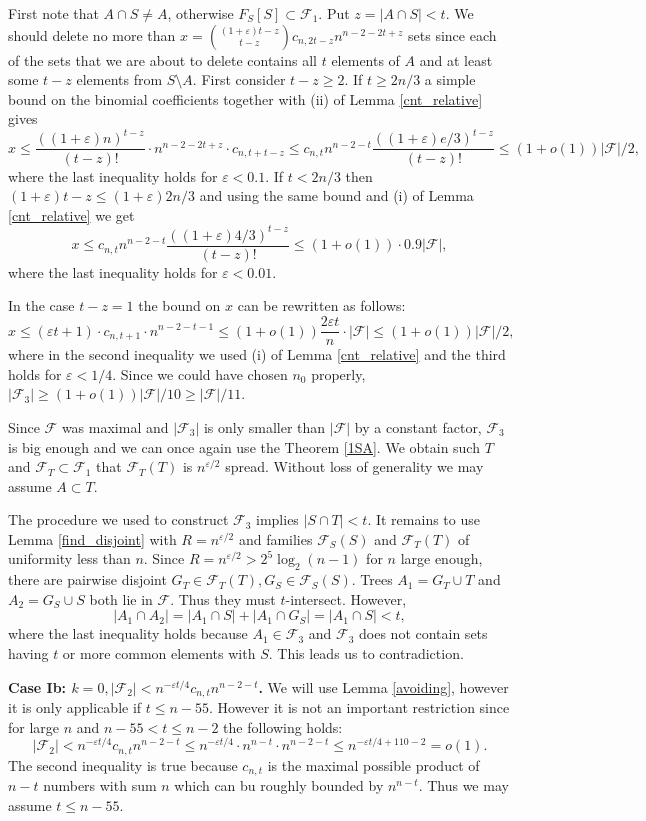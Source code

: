 \documentclass[11pt,letterpaper]{amsart}
\newcommand{\eps}{\varepsilon}
\renewcommand{\le}{\leqslant}
\renewcommand{\ge}{\geqslant}
\newcommand{\ff}{\mathcal{F}}
\begin{document}
First note that $A\cap S \neq A$, otherwise $F_S[S] \subset \ff_1$. Put $z = |A\cap S| < t.$ We should delete no more than $x = {(1+\eps)t - z \choose t - z}c_{n, 2t-z}n^{n - 2 - 2t + z}$ sets since each of the sets that we are about to delete contains all $t$ elements of $A$ and at least some $t-z$ elements from $S\setminus A$. First consider $t - z \ge 2$. If $t \ge 2n/3$ a simple bound on the binomial coefficients together with (ii) of Lemma \ref{cnt_relative} gives $$x \le \frac{((1+\eps)n)^{t-z}}{(t-z)!}\cdot n^{n-2-2t+z} \cdot c_{n, t+t-z} \leqslant c_{n, t}n^{n-2-t}\frac{((1+\eps)e/3)^{t-z}}{(t-z)!} \le (1+o(1))|\ff|/2,$$ where the last inequality holds for $\eps < 0.1$. If $t < 2n/3$ then $(1+\eps)t - z \leqslant (1 + \eps)2n/3$ and using the same bound and (i) of Lemma \ref{cnt_relative} we get $$x \leqslant c_{n, t}n^{n-2-t}\frac{((1+\eps)4/3)^{t-z}}{(t-z)!} \le (1+o(1))\cdot 0.9|\ff|,$$ where the last inequality holds for $\eps < 0.01$.

In the case $t-z = 1$ the bound on $x$ can be rewritten as follows: $$x \le (\eps t+1)\cdot c_{n, t+1}\cdot n^{n-2-t-1}\le (1 + o(1)) \frac{2\eps t}{n}\cdot |\ff| \leqslant (1+o(1))|\ff|/2,$$ where in the second inequality we used (i) of Lemma \ref{cnt_relative} and the third holds for $\eps < 1/4$. Since we could have chosen $n_0$ properly, $|\ff_3| \ge (1+o(1))|\ff|/10 \ge |\ff|/11$. 

Since $\ff$ was maximal and $|\ff_3|$ is only smaller than $|\ff|$ by a constant factor, $\ff_3$ is big enough and we can once again use the Theorem \ref{1SA}. We obtain such $T$ and $\ff_T\subset \ff_1$ that $\ff_T(T)$ is $n^{\eps/2}$ spread. Without loss of generality we may assume $A \subset T$. 

The procedure we used to construct $\ff_3$ implies $|S\cap T| < t$. It remains to use Lemma \ref{find_disjoint} with $R = n^{\eps/2}$ and families $\ff_S(S)$ and $\ff_T(T)$ of uniformity less than $n$. Since $R = n^{\eps/2} > 2^{5}\log_2(n-1)$ for $n$ large enough, there are pairwise disjoint $G_T \in \ff_T(T), G_S \in \ff_S(S)$. Trees $A_1 = G_T \cup T$ and $A_2 = G_S\cup S$ both lie in $\ff$. Thus they must $t$-intersect. However, $$|A_1 \cap A_2|  = |A_1 \cap S| + |A_1 \cap G_S| = |A_1 \cap S| < t, $$ where the last inequality holds because $A_1 \in \ff_3$ and $\ff_3$ does not contain sets having $t$ or more common elements with $S$. This leads us to contradiction.


\textbf{Case Ib: $k = 0, |\ff_2| < {n^{-\eps t/4}}c_{n, t}n^{n-2-t}$.} We will use Lemma \ref{avoiding}, however it is only applicable if $t \le n - 55$. However it is not an important restriction since for large $n$ and $n - 55 < t \le n-2$ the following holds: $$|\ff_2| < {n^{-\eps t/4}}c_{n, t}n^{n-2-t} \le n^{-\eps t/4} \cdot n^{n - t} \cdot n^{n - 2 - t} \le n^{-\eps t/4 + 110 - 2} = o(1).$$ The second inequality is true because $c_{n, t}$ is the maximal possible product of $n-t$ numbers with sum $n$ which can bu roughly bounded by $n^{n-t}$. Thus we may assume $t \le n - 55$. 
\end{document}
